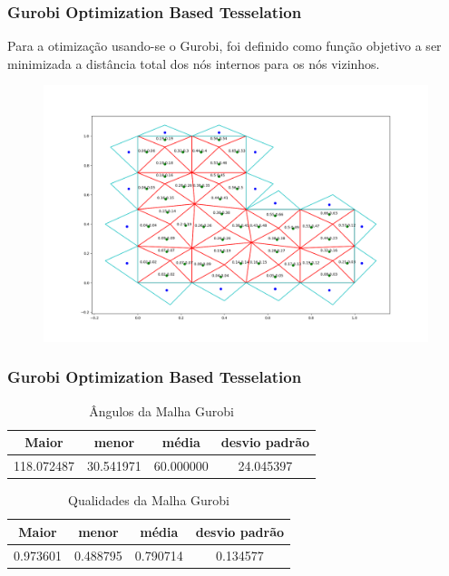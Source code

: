 \documentclass{beamer}
\begin{document}
\begin{frame}
  \frametitle{Gurobi Optimization Based Tesselation}

  Para a otimização usando-se o Gurobi, foi definido como função objetivo a ser minimizada a distância total dos nós internos para os nós vizinhos.

  \begin{figure}
    \includegraphics[width=0.6\linewidth]{malha-gurobi.png}
  \end{figure}



\end{frame}
\begin{frame}
  \frametitle{Gurobi Optimization Based Tesselation}

  \begin{table}[hb]
    \centering
    \par\caption{Ângulos da Malha Gurobi}
    \begin{tabular}{c|c|c|c}
      Maior      & menor     & média     & desvio padrão \\\hline\hline
      118.072487 & 30.541971 & 60.000000 & 24.045397     \\\hline
    \end{tabular}
    \label{tab:angulos-malha-gurobi}
  \end{table}

  \begin{table}[hb]
    \centering
    \par\caption{Qualidades da Malha Gurobi}
    \begin{tabular}{c|c|c|c}
      Maior    & menor    & média    & desvio padrão \\\hline\hline
      0.973601 & 0.488795 & 0.790714 & 0.134577      \\\hline
    \end{tabular}
    \label{tab:qualidades-malha-gurobi}
  \end{table}

\end{frame}
\end{document}

